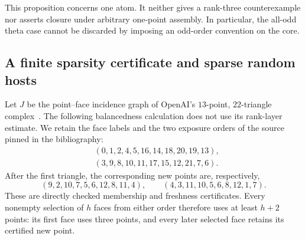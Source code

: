 This proposition concerns one atom.  It neither gives a rank-three
counterexample nor asserts closure under arbitrary one-point assembly.
In particular, the all-odd theta case cannot be discarded by imposing
an odd-order convention on the core.

\subsection{A finite sparsity certificate and sparse random hosts}

Let $J$ be the point--face incidence graph of OpenAI's $13$-point,
$22$-triangle complex~\citep[finite-complex proposition, part~(ii), and
exposure-order table]{openai161}.  The following balancedness calculation
does not use its rank-layer estimate.  We retain the face labels and
the two exposure orders of the source pinned in the bibliography:
\[
\begin{split}
 &(0,1,2,4,5,16,14,18,20,19,13),\\
 &(3,9,8,10,11,17,15,12,21,7,6).
\end{split}
\]
After the first triangle, the corresponding new points are, respectively,
\[
 (9,2,10,7,5,6,12,8,11,4),\qquad
 (4,3,11,10,5,6,8,12,1,7).
\]
These are directly checked membership and freshness certificates.
Every nonempty selection of $h$ faces from either order therefore uses
at least $h+2$ points: its first face uses three points, and every later
selected face retains its certified new point.

